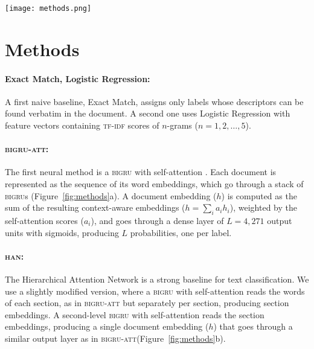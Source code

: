 \documentclass[11pt,a4paper]{article}
\newcommand{\bigruatt}{\textsc{bigru-att}\xspace}
\newcommand{\bigru}{\textsc{bigru}\xspace}
\newcommand{\han}{\textsc{han}\xspace}
\newcommand{\lwangru}{\textsc{bigru-lwan}\xspace}
\newcommand{\bert}{\textsc{bert}\xspace}
\newcommand{\tfidf}{\textsc{tf-idf}\xspace}
\begin{document}
\begin{figure*}[ht]
  \centering
    \texttt{[image: methods.png]}
  \caption{Illustration of (a) \bigruatt, (b) \han, (c) \lwangru, and (d) \bert.}
  \vspace*{-4mm}
  \label{fig:methods}
\end{figure*}

\section{Methods}
\label{sec:methods}

\paragraph{Exact Match, Logistic Regression:} 
A first naive baseline, Exact Match, assigns only labels whose descriptors can be found verbatim in the document. A second one uses Logistic Regression with feature vectors containing \tfidf scores of $n$-grams ($n=1,2,\dots, 5$).

\paragraph{\bigruatt:}

The first neural method is a \textsc{bigru} with self-attention \cite{Xu2015}. Each document is represented as the sequence of its word embeddings, which go through a stack of \textsc{bigru}s (Figure~\ref{fig:methods}a). A document embedding ($h$) is computed as the sum of the resulting context-aware embeddings ($h = \sum_i a_i h_i$), weighted by the self-attention scores ($a_i$), and goes through a dense layer of $L=4,271$ output units with sigmoids, producing $L$ probabilities, one per label.

\paragraph{\han:}

The Hierarchical Attention Network \cite{Yang2016} is a strong baseline for text classification. We use a slightly modified version, where a \bigru with self-attention reads the words of each section, as in \bigruatt but separately per section, producing section embeddings. A second-level \bigru with self-attention reads the section embeddings, producing a single document embedding ($h$) that goes through a similar output layer as in \bigruatt (Figure~\ref{fig:methods}b).
\end{document}
